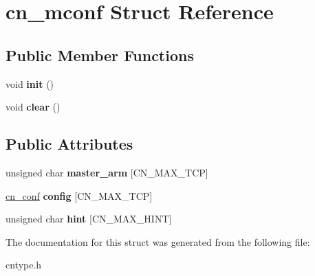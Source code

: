 \hypertarget{structcn__mconf}{\section{cn\-\_\-mconf Struct Reference}
\label{structcn__mconf}
}
\subsection*{Public Member Functions}
\begin{DoxyCompactItemize}
\item 
\hypertarget{structcn__mconf_a2d8b539a8db2cbf4b0991611bd9c0eea}{void {\bfseries init} ()}\label{structcn__mconf_a2d8b539a8db2cbf4b0991611bd9c0eea}

\item 
\hypertarget{structcn__mconf_afeef083d34473f1c3ad667a9091602cb}{void {\bfseries clear} ()}\label{structcn__mconf_afeef083d34473f1c3ad667a9091602cb}

\end{DoxyCompactItemize}
\subsection*{Public Attributes}
\begin{DoxyCompactItemize}
\item 
\hypertarget{structcn__mconf_a921b3e8659c5c2993e39f793fbd470f5}{unsigned char {\bfseries master\-\_\-arm} \mbox{[}C\-N\-\_\-\-M\-A\-X\-\_\-\-T\-C\-P\mbox{]}}\label{structcn__mconf_a921b3e8659c5c2993e39f793fbd470f5}

\item 
\hypertarget{structcn__mconf_a9f88d2b4aecbf69221cb705659e5a2d3}{\hyperlink{structcn__conf}{cn\-\_\-conf} {\bfseries config} \mbox{[}C\-N\-\_\-\-M\-A\-X\-\_\-\-T\-C\-P\mbox{]}}\label{structcn__mconf_a9f88d2b4aecbf69221cb705659e5a2d3}

\item 
\hypertarget{structcn__mconf_abf223322ac0e67dba30ce99585f53eb3}{unsigned char {\bfseries hint} \mbox{[}C\-N\-\_\-\-M\-A\-X\-\_\-\-H\-I\-N\-T\mbox{]}}\label{structcn__mconf_abf223322ac0e67dba30ce99585f53eb3}

\end{DoxyCompactItemize}


The documentation for this struct was generated from the following file\-:\begin{DoxyCompactItemize}
\item 
cntype.\-h\end{DoxyCompactItemize}
